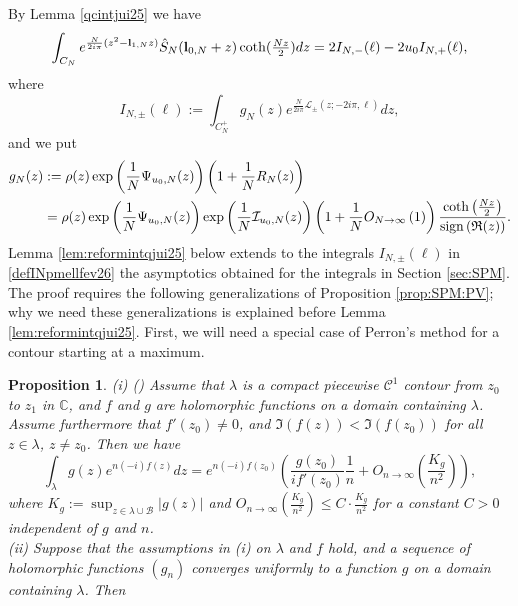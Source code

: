 \documentclass[11pt]{amsart}
\newtheorem{prop}[teo]{Proposition}
\newcommand{\mc}{\mathbb{C}}
\newcommand{\bl}{{\bf l}}
\newcommand{\ra}{\rightarrow}
\begin{document}
{By Lemma \ref{qcintjui25} we have 
\begin{equation}\label{finalestimatefev26}\int_{C_N} e^{\frac{N}{2i\pi}(z^2 - \bl_{1,N} z)}\hat S_N(\bl_{0,N} + z)\textstyle \coth(\frac{Nz}{2}) dz =
 2I_{N,-}(\ell) -2u_0  I_{N,+}(\ell),
 \end{equation}
 where
\begin{equation} I_{N,\pm}(\ell)  := \int_{C_N^+} g_N(z)e^{\frac{N}{2i\pi} \mathcal{L}_{\pm}(z;-2i\pi,\ell)} dz,\label{defINpmellfev26}
\end{equation}
and we put
\begin{align}
g_N(z)& := \rho(z) \exp\left(\frac{1}{N}\Psi_{u_0,N}(z)\right)\left(1 + \frac{1}{N}R_N(z)\right)\label{defgNjanv26}\\
& =\rho(z) \exp\left(\frac{1}{N}\Psi_{u_0,N}(z)\right)
\exp\left(\frac{1}{N}\mathcal{I}_{u_0,N}(z)\right)\left(1+\frac{1}{N}O_{N\ra \infty}\left(1\right)\right)
	\dfrac{ \coth\left(\frac{Nz}{2}\right) }{ \mathrm{sign}\left(\mathfrak{R}(z)\right)}.\notag
\end{align}
Lemma \ref{lem:reformintqjui25} below extends to the integrals $I_{N,\pm}(\ell)$ in \eqref{defINpmellfev26} the asymptotics obtained for the integrals in Section \ref{sec:SPM}. The proof requires the following generalizations of Proposition \ref{prop:SPM:PV}; why we need these generalizations is explained before Lemma \ref{lem:reformintqjui25}. First, we will need a special case of Perron's method for a contour starting at a maximum.
\begin{prop} \label{Perronfev26} (i) {\rm (\cite[Theorem 1.2, case of $\mu=1$ and $S=1$]{O'Sul})} Assume that $\lambda$ is a compact piecewise $\mathcal{C}^1$ contour from $z_0$ to $z_1$ in $\mc$, and $f$ and $g$ are holomorphic functions on a domain containing $\lambda$. Assume furthermore that $f'(z_0)\ne 0$, and $\mathfrak{I}(f(z)) < \mathfrak{I}(f(z_0))$ for all $z\in \lambda$, $z\ne z_0$. Then we have 
\begin{equation}\label{1Perronmars26} \int_{\lambda} g(z) e^{n (-i) f(z)} dz = 
e^{n (-i) f(z_0)} \left (\dfrac{g(z_0)}{i f'(z_0)}\dfrac{1}{n}+ O_{n \to \infty}\left(\frac{K_g}{n^2}\right) \right ),
\end{equation} 
where $\textstyle K_g:= \sup_{z\in \lambda \cup \mathcal{B}}\vert g(z)\vert$ and $\textstyle O_{n \to \infty}\left(\frac{K_g}{n^2}\right)\leq C\cdot \frac{K_g}{n^2}$ for a constant $C>0$ independent of $g$ and $n$.\\
(ii) Suppose that the assumptions in (i) on $\lambda$ and $f$ hold, and a sequence of holomorphic functions $(g_n)$ converges uniformly to a function $g$ on a domain containing $\lambda$. Then 

\end{prop}}
\end{document}
